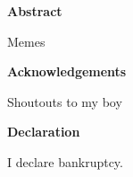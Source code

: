 \thispagestyle{plain}
\vspace*{\fill}
\begin{center}
    \textbf{Abstract}
\end{center}

Memes

\vspace*{\fill}
\pagebreak

\vspace*{\fill}
\begin{center}
    \textbf{Acknowledgements}
\end{center}

Shoutouts to my boy

\vspace*{\fill}
\pagebreak

\vspace*{\fill}
\begin{center}
    \textbf{Declaration}
\end{center}

I declare bankruptcy.

\vspace*{\fill}
\pagebreak